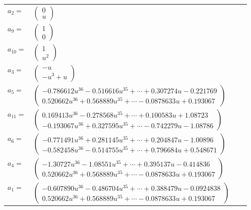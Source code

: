 \documentclass[1p]{elsarticle_modified}
\theoremstyle{definition}
\begin{document}
\begin{tabular}{m{7pt} m{180pt} m{7pt} m{180pt} }
\flushright $a_{2}=$&$\begin{pmatrix}0\\u\end{pmatrix}$ \\
\flushright $a_{9}=$&$\begin{pmatrix}1\\0\end{pmatrix}$ \\
\flushright $a_{10}=$&$\begin{pmatrix}1\\u^2\end{pmatrix}$ \\
\flushright $a_{3}=$&$\begin{pmatrix}- u\\- u^3+u\end{pmatrix}$ \\
\flushright $a_{5}=$&$\begin{pmatrix}-0.786612 u^{36}-0.516616 u^{35}+\cdots+0.307274 u-0.221769\\0.520662 u^{36}+0.568889 u^{35}+\cdots-0.0878633 u+0.193067\end{pmatrix}$ \\
\flushright $a_{11}=$&$\begin{pmatrix}0.169413 u^{36}-0.278568 u^{35}+\cdots+0.100583 u+1.08723\\-0.193067 u^{36}+0.327595 u^{35}+\cdots-0.742279 u-1.08786\end{pmatrix}$ \\
\flushright $a_{6}=$&$\begin{pmatrix}-0.771491 u^{36}+0.281145 u^{35}+\cdots+0.204847 u-1.00896\\-0.582458 u^{36}-0.514755 u^{35}+\cdots+0.796684 u+0.548671\end{pmatrix}$ \\
\flushright $a_{4}=$&$\begin{pmatrix}-1.30727 u^{36}-1.08551 u^{35}+\cdots+0.395137 u-0.414836\\0.520662 u^{36}+0.568889 u^{35}+\cdots-0.0878633 u+0.193067\end{pmatrix}$ \\
\flushright $a_{1}=$&$\begin{pmatrix}-0.607890 u^{36}-0.486704 u^{35}+\cdots+0.388479 u-0.0924838\\0.520662 u^{36}+0.568889 u^{35}+\cdots-0.0878633 u+0.193067\end{pmatrix}$ \\

\end{tabular}
\end{document}
